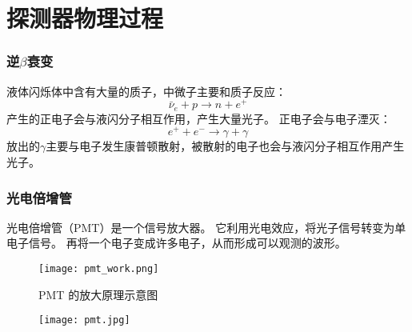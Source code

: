 \documentclass[aspectratio=169]{beamer}
\begin{document}
\section{探测器物理过程}
\begin{frame}
    \frametitle{逆$\beta$衰变}

    液体闪烁体中含有大量的质子，中微子主要和质子反应：
    \begin{equation*}
        \bar{\nu}_e+p\to n+e^+
    \end{equation*}
    产生的正电子会与液闪分子相互作用，产生大量光子。
    正电子会与电子湮灭：
    \begin{equation*}
        e^+ +e^-\to\gamma+\gamma
    \end{equation*}
    放出的$\gamma$主要与电子发生康普顿散射，被散射的电子也会与液闪分子相互作用产生光子。

\end{frame}

\begin{frame}
    \frametitle{光电倍增管}

    \begin{multicols}{2}
        光电倍增管（PMT）是一个信号放大器。
        它利用光电效应，将光子信号转变为单电子信号。
        再将一个电子变成许多电子，从而形成可以观测的波形。

        \begin{figure}
            \centering
            \texttt{[image: pmt\_work.png]}
            \caption{PMT 的放大原理示意图}
        \end{figure}
        \columnbreak
        \begin{figure}
            \centering
            \texttt{[image: pmt.jpg]}
        \end{figure}
    \end{multicols}

\end{frame}
\end{document}
